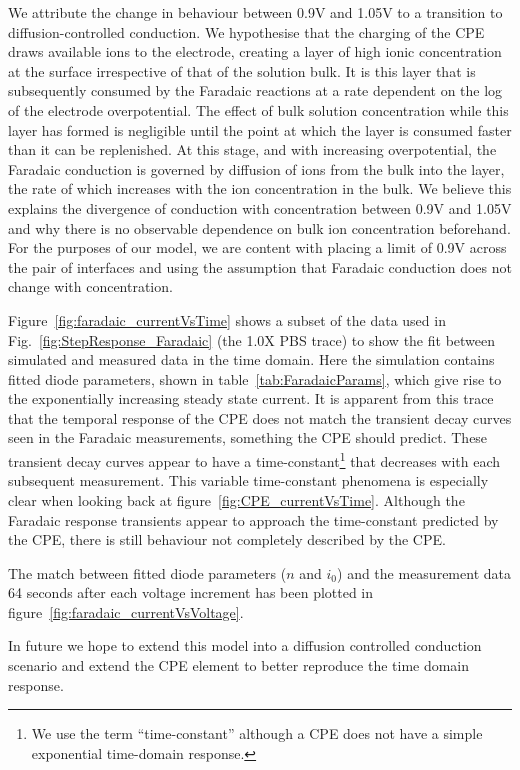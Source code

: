 \documentclass[journal, a4paper]{IEEEtran}
\begin{document}
We attribute the change in behaviour between 0.9\thinspace V and 1.05\thinspace V to a transition to diffusion-controlled conduction.
We hypothesise that the charging of the CPE draws available ions to the electrode, creating a layer of high ionic concentration at the surface irrespective of that of the solution bulk. It is this layer that is subsequently consumed by the Faradaic reactions at a rate dependent on the log of the electrode overpotential.  The effect of bulk solution concentration while this layer has formed is negligible until the point at which the layer is consumed faster than it can be replenished. At this stage, and with increasing overpotential, the Faradaic conduction is governed by diffusion of ions from the bulk into the layer, the rate of which increases with the ion concentration in the bulk. We believe this explains the divergence of conduction with concentration between 0.9\thinspace V and 1.05\thinspace V and why there is no observable dependence on bulk ion concentration beforehand.
For the purposes of our model, we are content with placing a limit of 0.9\thinspace V across the pair of interfaces and using the assumption that Faradaic conduction does not change with concentration.


    Figure~\ref{fig:faradaic_currentVsTime} shows a subset of the data used in Fig.~\ref{fig:StepResponse_Faradaic} (the 1.0X PBS trace) to show the fit between simulated and measured data in the time domain. Here the simulation contains fitted diode parameters, shown in table~\ref{tab:FaradaicParams}, which give rise to the exponentially increasing steady state current.
It is apparent from this trace that the temporal response of the CPE does not match the transient decay curves seen in the Faradaic measurements, something the CPE should predict. These transient decay curves appear to have a time-constant\footnote{We use the term ``time-constant'' although a CPE does not have a simple exponential time-domain response.} that decreases with each subsequent measurement. This variable time-constant phenomena is especially clear when looking back at figure~\ref{fig:CPE_currentVsTime}. Although the Faradaic response transients appear to approach the time-constant predicted by the CPE, there is still behaviour not completely described by the CPE.

The match between fitted diode parameters ($n$ and $i_{0}$) and the measurement data 64 seconds after each voltage increment has been plotted in figure~\ref{fig:faradaic_currentVsVoltage}.

In future we hope to extend this model into a diffusion controlled conduction scenario and extend the CPE element to better reproduce the time domain response.
\end{document}
